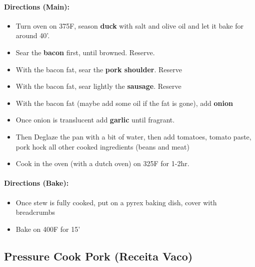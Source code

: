 \documentclass{article}
\begin{document}
\paragraph{Directions (Main):}
\begin{itemize}
    \item Turn oven on 375F, season \textbf{duck} with salt and olive oil and let it bake for around 40'.
    \item Sear the \textbf{bacon} first, until browned. Reserve.
    \item With the bacon fat, sear the \textbf{pork shoulder}. Reserve
    \item With the bacon fat, sear lightly the \textbf{sausage}. Reserve
    \item With the bacon fat (maybe add some oil if the fat is gone), add \textbf{onion}
    \item Once onion is translucent add \textbf{garlic} until fragrant.
    \item Then Deglaze the pan with a bit of water, then add tomatoes, tomato paste, pork hock all other cooked ingredients (beans and meat)
    \item Cook in the oven (with a dutch oven) on 325F for 1-2hr.
\end{itemize}  

\paragraph{Directions (Bake):}
\begin{itemize}
    \item Once stew is fully cooked, put on a pyrex baking dish, cover with breadcrumbs
    \item Bake on 400F for 15'
\end{itemize} 

\subsection{Pressure Cook Pork (Receita Vaco)}
\end{document}
